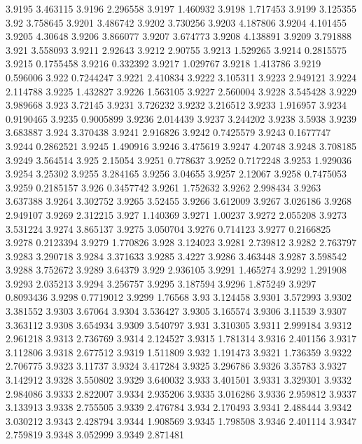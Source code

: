 3.9195  3.463115
3.9196  2.296558
3.9197  1.460932
3.9198  1.717453
3.9199  3.125355
3.92  3.758645
3.9201  3.486742
3.9202  3.730256
3.9203  4.187806
3.9204  4.101455
3.9205  4.30648
3.9206  3.866077
3.9207  3.674773
3.9208  4.138891
3.9209  3.791888
3.921  3.558093
3.9211  2.92643
3.9212  2.90755
3.9213  1.529265
3.9214  0.2815575
3.9215  0.1755458
3.9216  0.332392
3.9217  1.029767
3.9218  1.413786
3.9219  0.596006
3.922  0.7244247
3.9221  2.410834
3.9222  3.105311
3.9223  2.949121
3.9224  2.114788
3.9225  1.432827
3.9226  1.563105
3.9227  2.560004
3.9228  3.545428
3.9229  3.989668
3.923  3.72145
3.9231  3.726232
3.9232  3.216512
3.9233  1.916957
3.9234  0.9190465
3.9235  0.9005899
3.9236  2.014439
3.9237  3.244202
3.9238  3.5938
3.9239  3.683887
3.924  3.370438
3.9241  2.916826
3.9242  0.7425579
3.9243  0.1677747
3.9244  0.2862521
3.9245  1.490916
3.9246  3.475619
3.9247  4.20748
3.9248  3.708185
3.9249  3.564514
3.925  2.15054
3.9251  0.778637
3.9252  0.7172248
3.9253  1.929036
3.9254  3.25302
3.9255  3.284165
3.9256  3.04655
3.9257  2.12067
3.9258  0.7475053
3.9259  0.2185157
3.926  0.3457742
3.9261  1.752632
3.9262  2.998434
3.9263  3.637388
3.9264  3.302752
3.9265  3.52455
3.9266  3.612009
3.9267  3.026186
3.9268  2.949107
3.9269  2.312215
3.927  1.140369
3.9271  1.00237
3.9272  2.055208
3.9273  3.531224
3.9274  3.865137
3.9275  3.050704
3.9276  0.714123
3.9277  0.2166825
3.9278  0.2123394
3.9279  1.770826
3.928  3.124023
3.9281  2.739812
3.9282  2.763797
3.9283  3.290718
3.9284  3.371633
3.9285  3.4227
3.9286  3.463448
3.9287  3.598542
3.9288  3.752672
3.9289  3.64379
3.929  2.936105
3.9291  1.465274
3.9292  1.291908
3.9293  2.035213
3.9294  3.256757
3.9295  3.187594
3.9296  1.875249
3.9297  0.8093436
3.9298  0.7719012
3.9299  1.76568
3.93  3.124458
3.9301  3.572993
3.9302  3.381552
3.9303  3.67064
3.9304  3.536427
3.9305  3.165574
3.9306  3.11539
3.9307  3.363112
3.9308  3.654934
3.9309  3.540797
3.931  3.310305
3.9311  2.999184
3.9312  2.961218
3.9313  2.736769
3.9314  2.124527
3.9315  1.781314
3.9316  2.401156
3.9317  3.112806
3.9318  2.677512
3.9319  1.511809
3.932  1.191473
3.9321  1.736359
3.9322  2.706775
3.9323  3.11737
3.9324  3.417284
3.9325  3.296786
3.9326  3.35783
3.9327  3.142912
3.9328  3.550802
3.9329  3.640032
3.933  3.401501
3.9331  3.329301
3.9332  2.984086
3.9333  2.822007
3.9334  2.935206
3.9335  3.016286
3.9336  2.959812
3.9337  3.133913
3.9338  2.755505
3.9339  2.476784
3.934  2.170493
3.9341  2.488444
3.9342  3.030212
3.9343  2.428794
3.9344  1.908569
3.9345  1.798508
3.9346  2.401114
3.9347  2.759819
3.9348  3.052999
3.9349  2.871481
